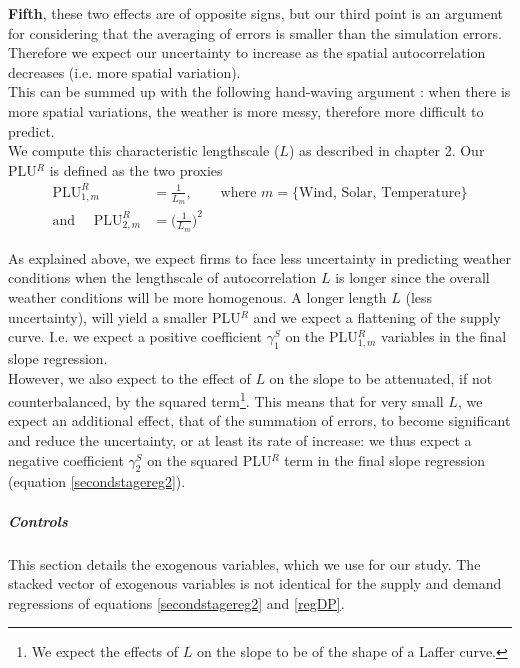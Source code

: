 \textbf{Fifth}, these two effects are of opposite signs, but our third point is an argument for considering that the averaging of errors is smaller than the simulation errors. Therefore we expect our uncertainty to increase as the spatial autocorrelation decreases (i.e. more spatial variation). \\

This can be summed up with the following hand-waving argument : when there is more spatial variations, the weather is more messy, therefore more difficult to predict. \\

We compute this characteristic lengthscale ($L$) as described in chapter 2. Our PLU$^R$ is defined as the two proxies 
\begin{align}
 \text{PLU}^R_{1,m} &= \frac{1}{L_m}, \quad \quad  \text{where } m=\{\text{Wind, Solar, Temperature}\} \\
  \text{and }  \quad \text{PLU}^R_{2,m} &=  \bigl(\frac{1}{L_m}\bigr)^2
\end{align}

As explained above, we expect firms to face less uncertainty in predicting weather conditions when the lengthscale of autocorrelation $L$ is longer since the overall weather conditions will be more homogenous. A longer length $L$ (less uncertainty), will yield a smaller PLU$^R$ and we expect a flattening of the supply curve. I.e. we expect a positive coefficient $\gamma^S_1$ on the PLU$^R_{1,m}$ variables in the final slope regression.\\

However, we also expect to the effect of $L$ on the slope to be attenuated, if not counterbalanced, by the squared term\footnote{We expect the effects of $L$ on the slope to be of the shape of a Laffer curve.}. This means that for very small $L$, we expect an additional effect, that of the summation of errors, to become significant and reduce the uncertainty, or at least its rate of increase: we thus expect a negative coefficient $\gamma^S_2$ on the squared PLU$^R$ term in the final slope regression (equation \ref{secondstagereg2}). 

\subparagraph{Controls}
\label{controlssec}

This section details the exogenous variables, which we use for our study. The stacked vector of exogenous variables is not identical for the supply and demand regressions of equations \ref{secondstagereg2} and \ref{regDP}.\\ 

